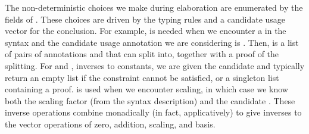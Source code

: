 The non-deterministic choices we make during elaboration are enumerated by
the fields of .
These choices are driven by the typing rules and a candidate usage vector for
the conclusion.
For example, \AgdaSpace{} is needed when we
encounter a  in the syntax and the candidate
usage annotation we are considering is .
Then, \AgdaSpace{} is a list of pairs of
annotations  and  that  can split into,
together with a proof of the splitting.
For  and , inverses to constants,
we are given the candidate  and typically return an empty list if
the constraint cannot be satisfied, or a singleton list containing a proof.
 is used when we encounter scaling, in which case we know
both the scaling factor  (from the syntax description) and the
candidate .
These inverse operations combine monadically (in fact, applicatively) to give
inverses to the vector operations of zero, addition, scaling, and basis.


